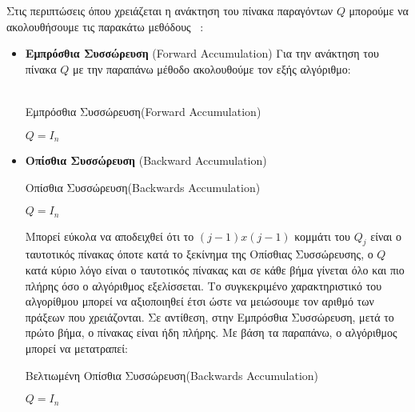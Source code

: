 Στις περιπτώσεις όπου χρειάζεται η ανάκτηση του πίνακα παραγόντων $Q$ μπορούμε να ακολουθήσουμε τις παρακάτω μεθόδους ~\cite{van1983matrix}:
\begin{itemize}
    \item \textbf{Εμπρόσθια Συσσώρευση} (\textlatin{Forward Accumulation})
    Για την ανάκτηση του πίνακα $Q$ με την παραπάνω μέθοδο ακολουθούμε τον εξής αλγόριθμο:\\\\
    \begin{algorithm}[H]
        \SetAlgoLined
        \caption{ Εμπρόσθια Συσσώρευση(\textlatin{Forward Accumulation})}
        $Q = I_n$\\
    \end{algorithm}
    \item \textbf{Οπίσθια Συσσώρευση} (\textlatin{Backward Accumulation})\\
    \begin{algorithm}[H]
        \SetAlgoLined
        \caption{ Οπίσθια Συσσώρευση(Backwards Accumulation)}
        $Q = I_n$\\
    \end{algorithm}
    
    Μπορεί εύκολα να αποδειχθεί ότι το $(j-1)x(j-1)$ κομμάτι του $Q_j$ είναι ο ταυτοτικός πίνακας όποτε κατά το ξεκίνημα της Οπίσθιας Συσσώρευσης, ο $Q$ κατά κύριο λόγο είναι ο ταυτοτικός πίνακας και σε κάθε βήμα γίνεται όλο και πιο πλήρης όσο ο αλγόριθμος εξελίσσεται. Το συγκεκριμένο χαρακτηριστικό του αλγορίθμου μπορεί να αξιοποιηθεί έτσι ώστε να μειώσουμε τον αριθμό των πράξεων που χρειάζονται. Σε αντίθεση, στην Εμπρόσθια Συσσώρευση, μετά το πρώτο βήμα, ο πίνακας είναι ήδη πλήρης. Με βάση τα παραπάνω, ο αλγόριθμος μπορεί να μετατραπεί:\\
    
    \begin{algorithm}[H]
        \SetAlgoLined
        \caption{ Βελτιωμένη Οπίσθια Συσσώρευση(Backwards Accumulation)}
        $Q = I_n$\\
    \end{algorithm}
\end{itemize}

